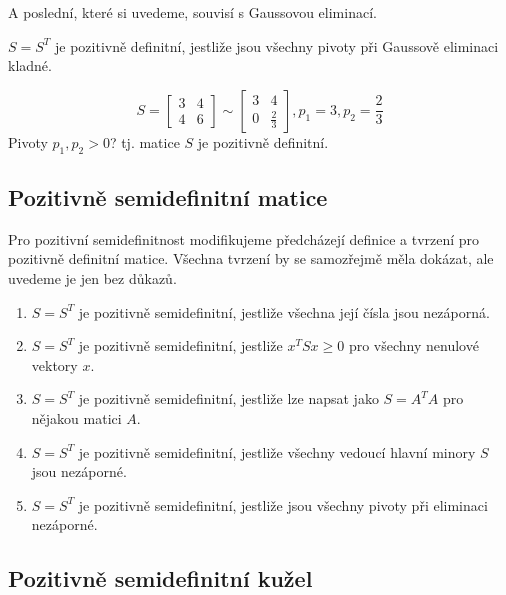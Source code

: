 A poslední, které si uvedeme, souvisí s Gaussovou eliminací.

\begin{vt2}\cite{linear-algebra-and-learning-from-data}
    $S = S^T$ je pozitivně definitní, jestliže jsou všechny pivoty při Gaussově eliminaci kladné.
\end{vt2}

\begin{pr}
    $$  S =
        \begin{bmatrix}
            3 & 4 \\
            4 & 6
        \end{bmatrix}
        \sim
        \begin{bmatrix}
            3 & 4 \\
            0 & \frac{2}{3}
        \end{bmatrix},
        p_1 = 3, p_2 = \frac{2}{3} 
    $$
    Pivoty $p_1, p_2 > 0$? tj. matice $S$ je pozitivně definitní.
\end{pr}

\subsection*{Pozitivně semidefinitní matice}

Pro pozitivní semidefinitnost modifikujeme předcházejí definice a tvrzení pro pozitivně definitní matice. Všechna tvrzení by se samozřejmě měla dokázat, ale uvedeme je jen bez důkazů.
\begin{enumerate}
    \item $S = S^T$ je pozitivně semidefinitní, jestliže všechna její čísla jsou nezáporná.
    \item $S = S^T$ je pozitivně semidefinitní, jestliže $x^TSx \geq 0$ pro všechny nenulové vektory $x$.
    \item \cite{linear-algebra-and-learning-from-data} $S = S^T$ je pozitivně semidefinitní, jestliže lze napsat jako $S = A^T A$ pro nějakou matici $A$.
    \item \cite{linear-algebra-and-learning-from-data} $S = S^T$ je pozitivně semidefinitní, jestliže všechny vedoucí hlavní minory $S$ jsou nezáporné.
    \item \cite{linear-algebra-and-learning-from-data} $S = S^T$ je pozitivně semidefinitní, jestliže jsou všechny pivoty při eliminaci nezáporné.
\end{enumerate}

\subsection*{Pozitivně semidefinitní kužel}

